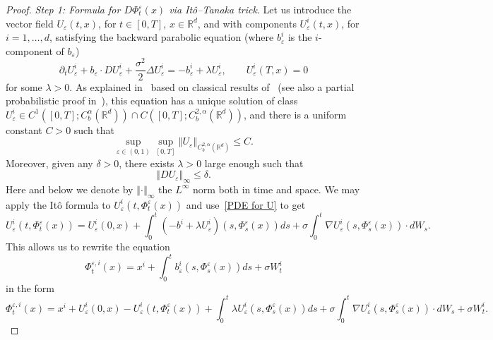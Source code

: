 \documentclass[a4paper,10pt]{article}
\newcommand\1{\mathbbm{1}}
\newcommand{\eps}{\varepsilon}
\numberwithin{equation}{section}
\begin{document}
\begin{proof}
\emph{Step 1: Formula for $D \Phi^{\eps}_t(x)$ via It\^o--Tanaka trick}. Let us introduce the vector field $U_{\eps}(t,x)  $, for $t\in [0,T]$, $x\in\mathbb{R}^{d}$, and with components $U_{\eps}^{i}(t,x)$, for $i=1,\ldots,d$, satisfying the backward parabolic equation (where $b_{\eps}^{i}$ is the $i$-component of
$b_{\eps}$)
\begin{equation}
\partial_t U_{\eps}^{i} + b_{\eps}\cdot DU_{\eps
}^{i}+\frac{\sigma^2}{2}\Delta U_{\eps}^{i}=-b_{\eps}^{i}+\lambda
U_{\eps}^{i},\qquad U_{\eps}^{i}(  T,x)
=0 \label{PDE for U} 
\end{equation}
for some $\lambda >0$. As explained in~\cite[Section~2]{FLAGUBPRI10} based on classical results of~\cite{Kr} (see also a partial probabilistic proof in~\cite{FLALNM}), this equation has a unique
solution of class $U_{\eps}^{i}\in C^{1}( [0,T] ;C_{b}^{\alpha}(\mathbb{R}^{d}))  \cap C([0,T];C_{b}^{2,\alpha}(\mathbb{R}^{d}))$, and there is a uniform constant $C>0$ such that
\begin{equation}
\sup_{\eps \in (0,1)} \sup_{[0,T]  }\left\Vert U_{\eps}\right\Vert _{C_{b} 
^{2,\alpha}(  \mathbb{R}^{d})  }\leq
C .\label{uniform estimate on U} 
\end{equation}
Moreover, given any $\delta>0$, there exists $\lambda>0$ large enough such that
\begin{equation}
\left\Vert DU_{\eps}\right\Vert _{\infty}\leq\delta .\label{uniform estimate on U 1/2} 
\end{equation}
Here and below we denote by $\left\Vert \cdot\right\Vert_{\infty}$ the $L^{\infty}$ norm both in time and space. We may apply the It\^{o} formula to $U_{\eps}^{i}(t,\Phi^{\eps}_t(x)  )$ and use~\eqref{PDE for U} to get \begin{equation*}
U_{\eps}^{i} ( t,\Phi^{\eps}_t(x)) =U_{\eps}^{i}(  0,x)  +\int_{0}^{t}(  -b^{i} + \lambda U_{\eps}^{i})  (  s,\Phi^{\eps}_s(x)) ds+\sigma\int_{0}^{t}\nabla U_{\eps}^{i}(  s,\Phi
^{\eps}_s(x) ) \cdot dW_{s} .
\end{equation*}
This allows us to rewrite the equation
\[
\Phi_{t}^{\eps,i}(x)  =x^{i}+\int_{0}^{t}b_{\eps}^{i}(s,\Phi^{\eps}_s(x))  ds+\sigma W_{t}^{i} 
\]
in the form
\begin{equation*}
\Phi^{\eps,i}_{t}(x) =x^{i}+U_{\eps}^{i}(0,x)  -U_{\eps}^{i}(  t,\Phi^{\eps}_t(x) ) + \int_{0}^{t}\lambda U_{\eps}^{i}(s,\Phi^{\eps}_s(x))  ds
+ \sigma\int_{0}^{t}\nabla U_{\eps}^{i}(s,\Phi^{\eps}_s(x)  )  \cdot dW_{s}+\sigma W_{t}^{i} .
\end{equation*}

\end{proof}
\end{document}
